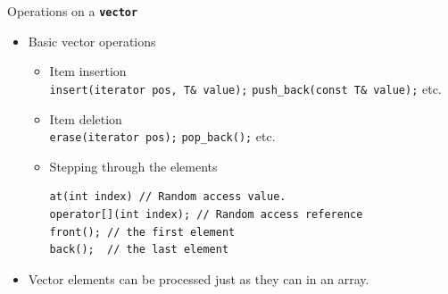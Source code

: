 \documentclass[14pt,aspectratio=1610]{beamer}
\begin{document}
\begin{frame}[fragile]{Operations on a \texttt{\bfseries vector}}
  \small
\begin{itemize}
\item
  Basic vector operations
  \begin{itemize}
  \item
    Item insertion\\
    \lstinline{insert(iterator pos, T& value);} \lstinline{push_back(const T& value);} etc.
  \item
    Item deletion\\
    \lstinline{erase(iterator pos);} \lstinline{pop_back();} etc.
  \item
    Stepping through the elements
    \begin{lstlisting}
at(int index) // Random access value.
operator[](int index); // Random access reference
front(); // the first element
back();  // the last element
\end{lstlisting}
  \end{itemize}
\item
  Vector elements can be processed just as they can in an array.
\end{itemize}
\end{frame}
\end{document}
